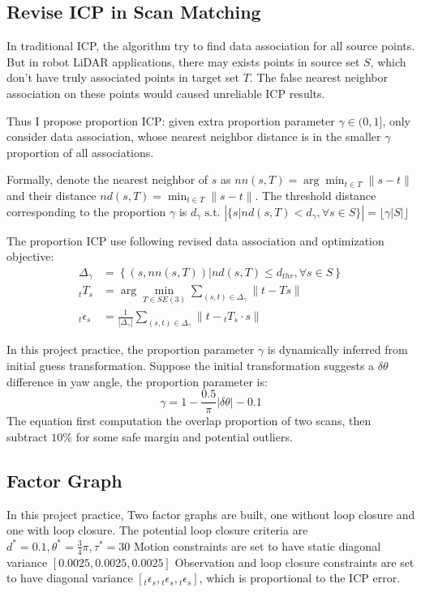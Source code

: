 \documentclass[conference]{IEEEtran}
\begin{document}
\subsection{Revise ICP in Scan Matching}
In traditional ICP, the algorithm try to find data association for all source points.
But in robot LiDAR applications, there may exists points in source set $S$, 
which don't have truly associated points in target set $T$.
The false nearest neighbor association on these points would
caused unreliable ICP results.

Thus I propose proportion ICP: given extra proportion parameter $\gamma \in (0,1]$,
only consider data association, 
whose nearest neighbor distance is in the smaller $\gamma$ proportion of all associations.

Formally, denote the nearest neighbor of $s$ as $nn(s, T) = \arg\min_{t \in T} \|s - t\|$ 
and their distance $nd(s, T) = \min_{t \in T} \|s - t\|$.
The threshold distance corresponding to the proportion $\gamma$ is 
$d_{\gamma} \text{ s.t. } \left|\{s | nd(s, T) < d_{\gamma}, \forall s \in S\}\right| = \lfloor\gamma |S| \rfloor$

The proportion ICP use following revised data association and optimization objective:
$$
\begin{aligned}
    \Delta_\gamma
    & = \left\{\left(s, nn(s,T) \right) | nd(s,T) \le d_{thr}, \forall s\in S\right\} \\
    {}_tT_s
    & = \arg\min_{T\in SE(3)} \sum\limits_{(s,t)\in\Delta_\gamma} \|t - Ts\| \\
    {}_t\epsilon_s
    & = \frac{1}{|\Delta_\gamma|} \sum\limits_{(s,t)\in\Delta_\gamma} \|t - {}_tT_s\cdot s\|
\end{aligned}
$$

In this project practice,
the proportion parameter $\gamma$ is dynamically inferred from initial guess transformation.
Suppose the initial transformation suggests a $\delta\theta$ difference in yaw angle,
the proportion parameter is:
$$\gamma = 1-\frac{0.5}{\pi}|\delta\theta| - 0.1$$
The equation first computation the overlap proportion of two scans, 
then subtract $10\%$ for some safe margin and potential outliers.

\subsection{Factor Graph}
In this project practice, 
Two factor graphs are built,
one without loop closure and one with loop closure.
The potential loop closure criteria are
$d^{*}=0.1, \theta^{*} =\frac{3}{4} \pi, \tau^{*} =30$
Motion constraints are set to have static 
diagonal variance $[0.0025, 0.0025, 0.0025]$
Observation and loop closure constraints are set to have 
diagonal variance $[{}_t\epsilon_{s}, {}_t\epsilon_{s}, {}_t\epsilon_{s}]$,
which is proportional to the ICP error.
\end{document}
